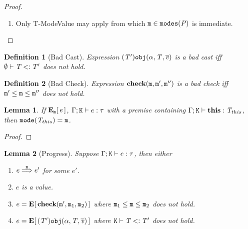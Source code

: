\documentclass[onecolumn,nocopyrightspace]{sigplanconf}
\newtheorem{lemma}{Lemma}
\newtheorem{definition}{Definition}
\theoremstyle{lessintrusive}
\theoremstyle{plain}
\theoremstyle{custom}
\theoremstyle{subcase-custom}
\begin{document}
\begin{proof}
\begin{enumerate}[(\arabic*)]
\item Only T-ModeValue may apply from which $\mathtt{m} \in \mathtt{modes}(\mathit{P})$ is immediate.

\end{enumerate} 

\end{proof}

\begin{definition}[Bad Cast]
Expression $(\mathit{T}') \mathtt{obj}(\alpha,\mathit{T},\overline{\mathit{v}})$ is a bad cast iff $\emptyset \vdash \mathit{T} \mathbin{<\vcentcolon} \mathit{T}'$ does not hold.
\label{pf:badcast}
\end{definition}

\begin{definition}[Bad Check]
Expression $\texttt{\bf check}(\mathtt{m},\mathtt{m}',\mathtt{m}'')$ is a bad check iff $\mathtt{m}' \leq \mathtt{m} \leq \mathtt{m}''$ does not hold.
\label{pf:badcheck}
\end{definition} 

\begin{lemma}
\label{pf:this-equals-context-mode}
If ${\bf E}_{\mathtt{m}}[\, e \,]$, $\Gamma;\mathtt{K}\vdash e:\tau$ with a premise containing $\Gamma;\mathtt{K}\vdash\texttt{\bf this}:\mathit{T}_{this}$, then $\mathtt{mode}(\mathit{T}_{this}) = \mathtt{m}$.
\end{lemma} 

\begin{proof}
\end{proof} 

\begin{lemma}[Progress]
\label{pf:progress}
Suppose $\Gamma;\mathtt{K}\vdash e:\tau$, then either
\leavevmode
\begin{enumerate}[(\arabic*)] 
\item $e \stackrel{\mathtt{m}}{\Longrightarrow} e'$ for some $e'$.
\item $e$ is a value.
\item $e = {\bf E}_{}[\, \texttt{\bf check}(\mathtt{m}',\mathtt{m}_1,\mathtt{m}_2) \,]$ where $\mathtt{m}_1\leq\mathtt{m}\leq\mathtt{m}_2$ does not hold.
\item $e = {\bf E}_{}[\, (\mathit{T}')\mathtt{obj}(\alpha,\mathit{T},\overline{\mathit{v}}) \,]$ where $\mathtt{K}\vdash\mathit{T}\mathbin{<\vcentcolon}\mathit{T}'$ does not hold.
\end{enumerate}
\end{lemma}
\end{document}
